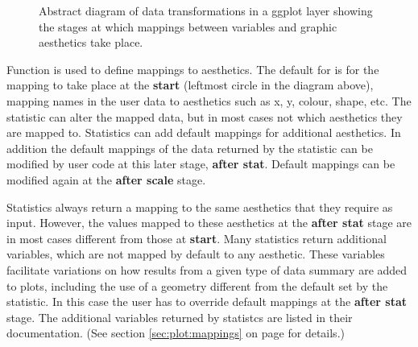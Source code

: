 \documentclass[krantz2]{krantz}\usepackage{knitr}
\begin{document}
\begin{figure}
{\sffamily
\centering
{}}
  \caption[Stages of data flow in a ggplot layer]{Abstract diagram of data transformations in a ggplot layer showing the stages at which mappings between variables and graphic aesthetics take place.}\label{fig:ggplot:stages}
\end{figure}


Function  is used to define mappings to aesthetics. The default for  is for the mapping to take place at the \textbf{start} (leftmost circle in the diagram above), mapping names in the user data to aesthetics such as x, y, colour, shape, etc. The statistic can alter the mapped data, but in most cases not which aesthetics they are mapped to. Statistics can add default mappings for additional aesthetics. In addition the default mappings of the data returned by the statistic can be modified by user code at this later stage, \textbf{after stat}. Default mappings can be modified again at the \textbf{after scale} stage.

\begin{explainbox}
Statistics always return a mapping to the same aesthetics that they require as input. However, the values mapped to these aesthetics at the \textbf{after stat} stage are in most cases different from those at \textbf{start}. Many statistics return additional variables, which are not mapped by default to any aesthetic. These variables facilitate variations on how results from a given type of data summary are added to plots, including the use of a geometry different from the default set by the statistic. In this case the user has to override default mappings at the \textbf{after stat} stage. The additional variables returned by statistcs are listed in their documentation. (See section \ref{sec:plot:mappings} on page \pageref{sec:plot:mappings} for details.)
\end{explainbox}
\end{document}
